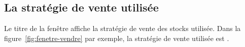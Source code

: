 \subsection{La strat\'egie de vente utilis\'ee}

Le titre de la fen\^etre affiche la strat\'egie de vente
des stocks utilis\'ee. Dans la figure~\ref{fig:fenetre-vendre}
par exemple, la strat\'egie de vente utilis\'ee est
\cmup.

\newpage

\label{sec:selectionner-articles-vendre}

